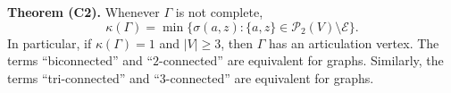 \textbf{Theorem (C2).} Whenever $\Gamma$ is not complete,
$$\kappa(\Gamma) = \min\{\sigma(a, z): \{a, z\} \in \mathcal{P}_2(V) \setminus \mathcal{E}\}.$$
In particular, if $\kappa(\Gamma) = 1$ and $|V| \geq 3$, then $\Gamma$ has an articulation vertex. The terms ``biconnected'' and ``$2$-connected'' are equivalent for graphs. Similarly, the terms ``tri-connected'' and ``$3$-connected'' are equivalent for graphs.
